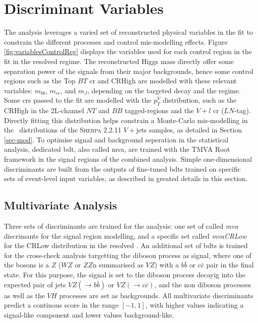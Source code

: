 \section{Discriminant Variables}\label{sec-vh-disc}
The analysis leverages a varied set of reconstructed physical variables in the fit to constrain the different processes and control mis-modelling effects. Figure \ref{fig:variablesControlReg} displays the variables used for each control region in the fit in the resolved regime. The reconstructed Higgs mass directly offer some separation power of the signals from their major backgrounds, hence some control regions such as the Top $BT$ \gls{cr} and CRHigh are modelled with these relevant variables: $m_{bb}$, $m_{cc}$, and $m_J$, depending on the targeted decay and the regime. Some \gls{cr}s passed to the fit are modelled with the $p_T^V$ distribution, such as the CRHigh in the 2L-channel $NT$ and $BB$ tagged-regions and the $V+l$ \gls{cr} ($LN$-tag). Directly fitting this distribution helps constrain a Monte-Carlo mis-modelling in the \ptv\ distributions of the \textsc{Sherpa} 2.2.11 $V+$jets samples, as detailed in Section \ref{sec-mod}. To optimise signal and background seperation in the statistical analysis, dedicated \gls{bdt}, also called \gls{mva}, are trained with the \textsc{TMVA} Root framework \cite{Therhaag:2011jh} in the signal regions of the combined analysis. Simple one-dimensional discriminants are built from the outputs of fine-tuned \gls{bdt}s trained on specific sets of event-level input variables, as described in greated details in this section. \\

\subsection{Multivariate Analysis}
Three sets of discriminants are trained for the analysis: one set of called \textit{\gls{mva}} discrimants for the signal region modelling, and a specific set called \textit{mvaCRLow} for the CRLow distribution in the resolved \vhb. An additional set of \gls{bdt}s is trained for the cross-check analysis targetting the diboson process as signal, where one of the bosons is a $Z$ ($WZ$ or $ZZ$n summarised as $VZ$) with a $b\bar{b}$ or $c\bar{c}$ pair in the final state. For this purpose, the signal is set to the diboson process decayig into the expected pair of jets $VZ(\rightarrow b\bar{b})$ or $VZ(\rightarrow c\bar{c})$, and the non diboson processes as well as the $VH$ processes are set as backgrounds. All multivariate discriminants predict a continous score in the range $[-1, 1]$, with higher values indicating a signal-like component and lower values background-like.


